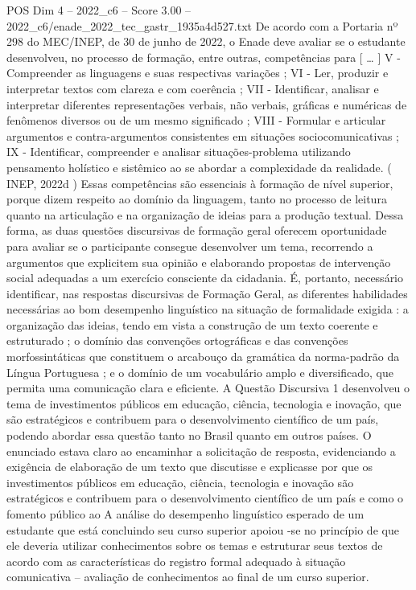 \begin{textsample}{POS Dim 4 – 2022\_c6 – Score 3.00 – 2022\_c6/enade\_2022\_tec\_gastr\_1935a4d527.txt}
De acordo com a Portaria nº 298 do MEC/INEP, de 30 de junho de 2022, o Enade deve avaliar se o estudante desenvolveu, no processo de formação, entre outras, competências para [ … ] V - Compreender as linguagens e suas respectivas variações ; VI - Ler, produzir e interpretar textos com clareza e com coerência ; VII - Identificar, analisar e interpretar diferentes representações verbais, não verbais, gráficas e numéricas de fenômenos diversos ou de um mesmo significado ; VIII - Formular e articular argumentos e contra-argumentos consistentes em situações sociocomunicativas ; IX - Identificar, compreender e analisar situações-problema utilizando pensamento holístico e sistêmico ao se abordar a complexidade da realidade. ( INEP, 2022d ) Essas competências são essenciais à formação de nível superior, porque dizem respeito ao domínio da linguagem, tanto no processo de leitura quanto na articulação e na organização de ideias para a produção textual.
Dessa forma, as duas questões discursivas de formação geral oferecem oportunidade para avaliar se o participante consegue desenvolver um tema, recorrendo a argumentos que explicitem sua opinião e elaborando propostas de intervenção social adequadas a um exercício consciente da cidadania.
É, portanto, necessário identificar, nas respostas discursivas de Formação Geral, as diferentes habilidades necessárias ao bom desempenho linguístico na situação de formalidade exigida : a organização das ideias, tendo em vista a construção de um texto coerente e estruturado ; o domínio das convenções ortográficas e das convenções morfossintáticas que constituem o arcabouço da gramática da norma-padrão da Língua Portuguesa ; e o domínio de um vocabulário amplo e diversificado, que permita uma comunicação clara e eficiente.
A Questão Discursiva 1 desenvolveu o tema de investimentos públicos em educação, ciência, tecnologia e inovação, que são estratégicos e contribuem para o desenvolvimento científico de um país, podendo abordar essa questão tanto no Brasil quanto em outros países.
O enunciado estava claro ao encaminhar a solicitação de resposta, evidenciando a exigência de elaboração de um texto que discutisse e explicasse por que os investimentos públicos em educação, ciência, tecnologia e inovação são estratégicos e contribuem para o desenvolvimento científico de um país e como o fomento público ao A análise do desempenho linguístico esperado de um estudante que está concluindo seu curso superior apoiou -se no princípio de que ele deveria utilizar conhecimentos sobre os temas e estruturar seus textos de acordo com as características do registro formal adequado à situação comunicativa – avaliação de conhecimentos ao final de um curso superior.

\end{textsample}
